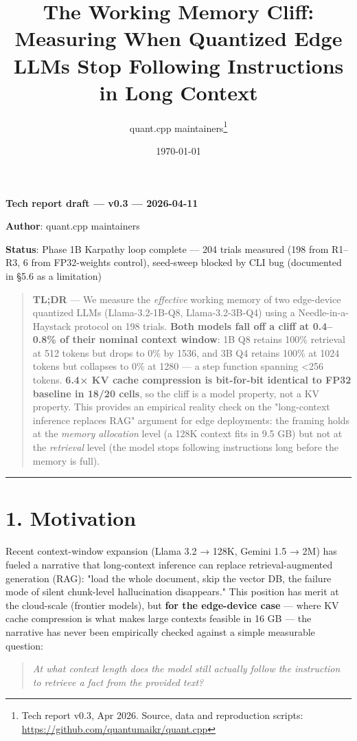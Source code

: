 \documentclass[11pt]{article}
\title{The Working Memory Cliff: Measuring When Quantized Edge LLMs Stop Following Instructions in Long Context}
\author{quant.cpp maintainers\thanks{Tech report v0.3, Apr 2026. Source, data and reproduction scripts: \url{https://github.com/quantumaikr/quant.cpp}}}
\date{\today}
\begin{document}
\maketitle



\textbf{Tech report draft — v0.3 — 2026-04-11}

\textbf{Author}: quant.cpp maintainers

\textbf{Status}: Phase 1B Karpathy loop complete — 204 trials measured (198 from R1–R3, 6 from FP32-weights control), seed-sweep blocked by CLI bug (documented in §5.6 as a limitation)


\begin{quote}
\textbf{TL;DR} — We measure the \textit{effective} working memory of two edge-device quantized LLMs (Llama-3.2-1B-Q8, Llama-3.2-3B-Q4) using a Needle-in-a-Haystack protocol on 198 trials. \textbf{Both models fall off a cliff at 0.4–0.8\% of their nominal context window}: 1B Q8 retains 100\% retrieval at 512 tokens but drops to 0\% by 1536, and 3B Q4 retains 100\% at 1024 tokens but collapses to 0\% at 1280 — a step function spanning <256 tokens. \textbf{6.4× KV cache compression is bit-for-bit identical to FP32 baseline in 18/20 cells}, so the cliff is a model property, not a KV property. This provides an empirical reality check on the "long-context inference replaces RAG" argument for edge deployments: the framing holds at the \textit{memory allocation} level (a 128K context fits in 9.5 GB) but not at the \textit{retrieval} level (the model stops following instructions long before the memory is full).
\end{quote}


\medskip\hrule\medskip


\section*{1. Motivation}


Recent context-window expansion (Llama 3.2 → 128K, Gemini 1.5 → 2M) has fueled a narrative that long-context inference can replace retrieval-augmented generation (RAG): "load the whole document, skip the vector DB, the failure mode of silent chunk-level hallucination disappears." This position has merit at the cloud-scale (frontier models), but \textbf{for the edge-device case} — where KV cache compression is what makes large contexts feasible in 16 GB — the narrative has never been empirically checked against a simple measurable question:


\begin{quote}
\textit{At what context length does the model still actually follow the instruction to retrieve a fact from the provided text?}
\end{quote}
\end{document}
